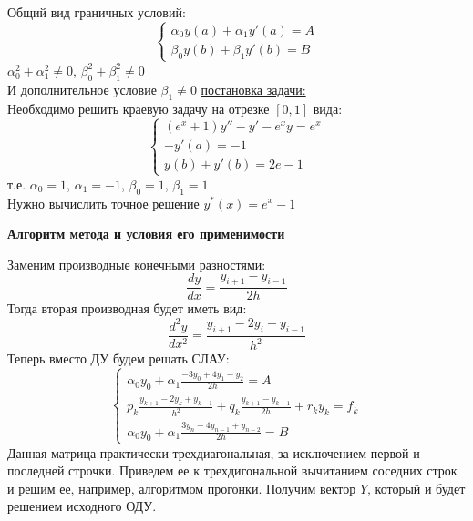 \documentclass{article}
\begin{document}
	Общий вид граничных условий:
	\begin{equation}
		\begin{cases}
			\alpha_0y(a) + \alpha_1y'(a) = A\\
			\beta_0y(b) + \beta_1y'(b) = B
		\end{cases}
	\end{equation}
	$\alpha_0^2+\alpha_1^2 \neq 0$, $\beta_0^2+\beta_1^2 \neq 0$\\
	И дополнительное условие $\beta_1 \neq 0$
	\underline{постановка задачи:}\\
	Необходимо решить краевую задачу на отрезке $[0,1]$ вида:
	\begin{equation}
		\begin{cases}
			(e^x + 1)y'' - y' - e^xy = e^x\\
			-y'(a) = -1\\
			y(b) + y'(b) = 2e - 1
		\end{cases}
	\end{equation}
	т.е. $\alpha_0 = 1$, $\alpha_1 = -1$, $\beta_0 = 1$, $\beta_1 = 1$\\
	Нужно вычислить точное решение $y^*(x) = e^x - 1$
	\begin{center} \textbf{Алгоритм метода и условия его применимости}\end{center}
	Заменим производные конечными разностями:
	\begin{equation}
		\frac{dy}{dx} = \frac{y_{i+1} - y_{i-1}}{2h}
	\end{equation}
	Тогда вторая производная будет иметь вид:
	\begin{equation}
		\frac{d^2y}{dx^2} = \frac{y_{i+1} - 2y_i + y_{i-1}}{h^2}	
	\end{equation}
	Теперь вместо ДУ будем решать СЛАУ:
	\begin{equation}
		\begin{cases}
			\displaystyle \alpha_0y_0 + \alpha_1\frac{-3y_0 + 4y_1 - y_2}{2h} = A\\
			\displaystyle p_k\frac{y_{k+1} - 2y_k + y_{k-1}}{h^2} + q_k\frac{y_{k+1} - y_{k-1}}{2h} + r_ky_k = f_k\\
			\displaystyle \alpha_0y_0 + \alpha_1\frac{3y_n - 4y_{n-1} + y_{n-2}}{2h} = B
		\end{cases}
	\end{equation}
	Данная матрица практически трехдиагональная, за исключением первой и последней строчки. Приведем ее к трехдигональной вычитанием соседних строк и решим ее, например, алгоритмом прогонки. Получим вектор $Y$, который и будет решением исходного ОДУ.
\end{document}
